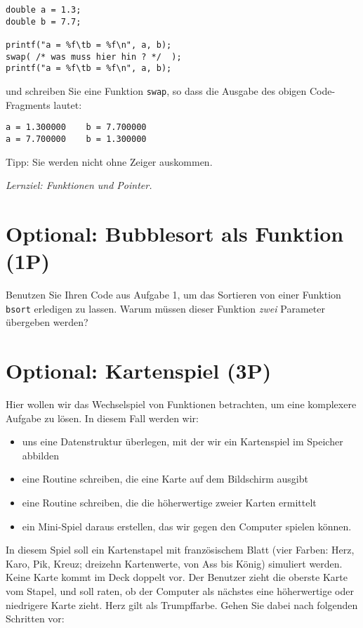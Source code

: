 \documentclass[
	ngerman,
	fontsize=10pt,
	parskip=half,
	titlepage=true,
	DIV=12
]{scrartcl}
\begin{document}
{\begin{verbatim}
double a = 1.3;
double b = 7.7;

printf("a = %f\tb = %f\n", a, b);
swap( /* was muss hier hin ? */  );
printf("a = %f\tb = %f\n", a, b);
\end{verbatim}

und schreiben Sie eine Funktion \texttt{swap}, so dass die Ausgabe des obigen Code-Fragments lautet:

\begin{verbatim}
a = 1.300000	b = 7.700000
a = 7.700000	b = 1.300000
\end{verbatim}

Tipp: Sie werden nicht ohne Zeiger auskommen.

\emph{Lernziel: Funktionen und Pointer.}


\section{Optional: Bubblesort als Funktion (1P)}
Benutzen Sie Ihren Code aus Aufgabe 1, um das Sortieren von einer Funktion \texttt{bsort} erledigen zu lassen. Warum müssen dieser Funktion \emph{zwei} Parameter übergeben werden?


\section{Optional: Kartenspiel (3P)}
Hier wollen wir das Wechselspiel von Funktionen betrachten, um eine komplexere Aufgabe zu lösen. In diesem Fall werden wir:
\begin{itemize}
\item uns eine Datenstruktur überlegen, mit der wir ein Kartenspiel im Speicher abbilden
\item eine Routine schreiben, die eine Karte auf dem Bildschirm ausgibt
\item eine Routine schreiben, die die höherwertige zweier Karten ermittelt
\item ein Mini-Spiel daraus erstellen, das wir gegen den Computer spielen können.
\end{itemize}

In diesem Spiel soll ein Kartenstapel mit französischem Blatt (vier Farben: Herz, Karo, Pik, Kreuz; dreizehn Kartenwerte, von Ass bis König) simuliert werden. Keine Karte kommt im Deck doppelt vor. Der Benutzer zieht die oberste Karte vom Stapel, und soll raten, ob der Computer als nächstes eine höherwertige oder niedrigere Karte zieht. Herz gilt als Trumpffarbe. Gehen Sie dabei nach folgenden Schritten vor:

}
\end{document}
